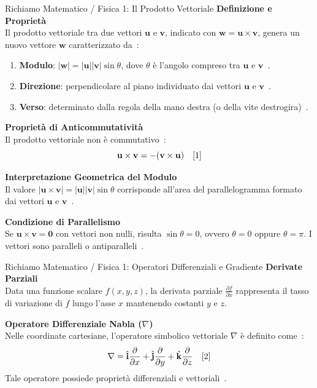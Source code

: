 \documentclass[12pt, a4paper]{article}
\begin{document}
\begin{boxrichiamo}{Richiamo Matematico / Fisica 1: Il Prodotto Vettoriale}
\textbf{Definizione e Proprietà} \\
Il prodotto vettoriale tra due vettori $\mathbf{u}$ e $\mathbf{v}$, indicato con $\mathbf{w} = \mathbf{u} \times \mathbf{v}$, genera un nuovo vettore $\mathbf{w}$ caratterizzato da~\cite{1}:
\begin{enumerate}
    \item \textbf{Modulo}: $|\mathbf{w}| = |\mathbf{u}| |\mathbf{v}| \sin\theta$, dove $\theta$ è l'angolo compreso tra $\mathbf{u}$ e $\mathbf{v}$~\cite{1}.
    \item \textbf{Direzione}: perpendicolare al piano individuato dai vettori $\mathbf{u}$ e $\mathbf{v}$~\cite{1}.
    \item \textbf{Verso}: determinato dalla regola della mano destra (o della vite destrogira)~\cite{1}.
\end{enumerate}

\vspace{0.3cm}
\textbf{Proprietà di Anticommutatività} \\
Il prodotto vettoriale non è commutativo~\cite{1}:
\[
\mathbf{u} \times \mathbf{v} = - (\mathbf{v} \times \mathbf{u}) \quad \text{\cite{1}}
\]

\vspace{0.3cm}
\textbf{Interpretazione Geometrica del Modulo} \\
Il valore $|\mathbf{u} \times \mathbf{v}| = |\mathbf{u}| |\mathbf{v}| \sin\theta$ corrisponde all'area del parallelogramma formato dai vettori $\mathbf{u}$ e $\mathbf{v}$~\cite{1}.

\vspace{0.3cm}
\textbf{Condizione di Parallelismo} \\
Se $\mathbf{u} \times \mathbf{v} = \mathbf{0}$ con vettori non nulli, risulta $\sin\theta = 0$, ovvero $\theta = 0$ oppure $\theta = \pi$. I vettori sono paralleli o antiparalleli~\cite{1}.
\end{boxrichiamo}

\vspace{0.5cm}

\begin{boxrichiamo}{Richiamo Matematico / Fisica 1: Operatori Differenziali e Gradiente}
\textbf{Derivate Parziali} \\
Data una funzione scalare $f(x,y,z)$, la derivata parziale $\frac{\partial f}{\partial x}$ rappresenta il tasso di variazione di $f$ lungo l'asse $x$ mantenendo costanti $y$ e $z$.

\vspace{0.3cm}
\textbf{Operatore Differenziale Nabla ($\nabla$)} \\
Nelle coordinate cartesiane, l'operatore simbolico vettoriale $\nabla$ è definito come~\cite{2}:
\[
\nabla = \hat{\mathbf{i}} \frac{\partial}{\partial x} + \hat{\mathbf{j}} \frac{\partial}{\partial y} + \hat{\mathbf{k}} \frac{\partial}{\partial z} \quad \text{\cite{2}}
\]
Tale operatore possiede proprietà differenziali e vettoriali~\cite{2}.
\end{boxrichiamo}
\end{document}
